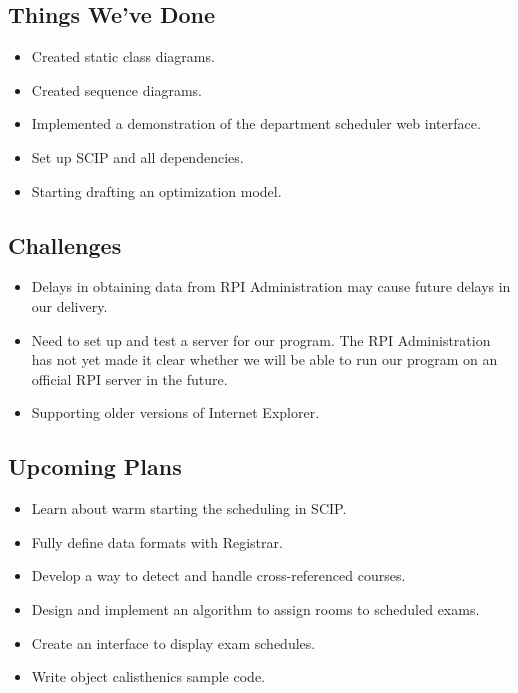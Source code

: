 \documentclass[11pt]{article}
\begin{document}
\subsection{Things We've Done}
\begin{itemize}
	\item Created static class diagrams.
	\item Created sequence diagrams.
	\item Implemented a demonstration of the department scheduler web interface.
	\item Set up SCIP and all dependencies.
	\item Starting drafting an optimization model. 
\end{itemize}

\subsection{Challenges}
\begin{itemize}
	\item Delays in obtaining data from RPI Administration may cause future delays in our delivery.
	\item Need to set up and test a server for our program. The RPI Administration has not yet made it clear whether we will be able to run our program on an official RPI server in the future.
	\item Supporting older versions of Internet Explorer.
\end{itemize}

\subsection{Upcoming Plans}
\begin{itemize}
	\item Learn about warm starting the scheduling in SCIP.
	\item Fully define data formats with Registrar.
	\item Develop a way to detect and handle cross-referenced courses.
	\item Design and implement an algorithm to assign rooms to scheduled exams.
	\item Create an interface to display exam schedules. 
	\item Write object calisthenics sample code.
\end{itemize}
\end{document}
